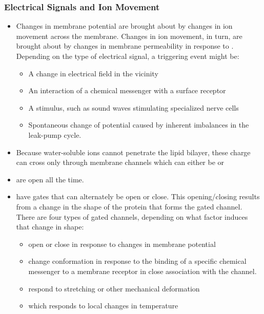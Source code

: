 \documentclass{article}
\numberwithin{equation}{section}
\begin{document}
\subsubsection{Electrical Signals and Ion Movement}
\begin{itemize}
    \item Changes in membrane potential are brought about by changes in ion movement across the membrane. Changes in ion movement, in turn, are brought about by changes in membrane permeability in response to . Depending on the type of electrical signal, a triggering event might be:
    \begin{itemize}
        \item A change in electrical field in the vicinity
        \item An interaction of a chemical messenger with a surface receptor
        \item A stimulus, such as sound waves stimulating specialized nerve cells
        \item Spontaneous change of potential caused by inherent imbalances in the leak-pump cycle.
    \end{itemize}
    \item Because water-soluble ions cannot penetrate the lipid bilayer, these charge can cross only through membrane channels which can either be  or 
    \item {} are open all the time.
    \item {} have gates that can alternately be open or close. This opening/closing results from a change in the shape of the protein that forms the gated channel. There are four types of gated channels, depending on what factor induces that change in shape:
    \begin{itemize}
        \item {} open or close in response to changes in membrane potential
        \item {} change conformation in response to the binding of a specific chemical messenger to a membrane receptor in close association with the channel.
        \item {} respond to stretching or other mechanical deformation
        \item {} which responds to local changes in temperature
    \end{itemize}
\end{itemize}
\end{document}
